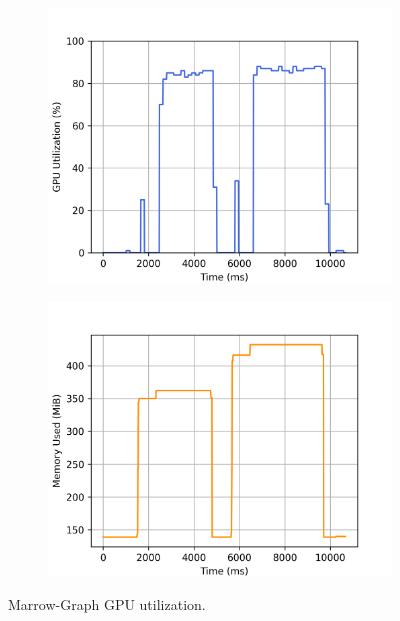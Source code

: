 \begin{figure}
    \begin{subfigure}{0.5\textwidth}
        \centering
        \includegraphics[width=\linewidth]{Chapters/Figures/plots/lmarrow-graph_update_spmv_log_gpu_utilization.png}
    \end{subfigure}%
    \begin{subfigure}{0.5\textwidth}
        \centering
        \includegraphics[width=\linewidth]{Chapters/Figures/plots/lmarrow-graph_update_spmv_log_gpu_memory.png}
    \end{subfigure}%
    \caption{Marrow-Graph GPU utilization.}
    \label{fig:lmarrow-graph_gpu_log}
\end{figure}


